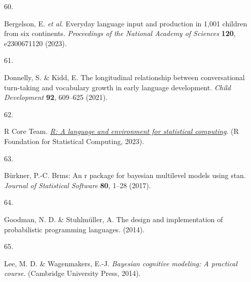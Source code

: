 \documentclass[
  man,floatsintext]{apa6}
\newlength{\cslhangindent}
\newlength{\csllabelwidth}
\newlength{\cslentryspacingunit} %
\newenvironment{CSLReferences}[2] %
 {%
  \setlength{\parindent}{0pt}
  \ifodd #1
  \let\oldpar\par
  \def\par{\hangindent=\cslhangindent\oldpar}
  \fi
  \setlength{\parskip}{#2\cslentryspacingunit}
 }%
 {}
\newcommand{\CSLLeftMargin}[1]{\parbox[t]{\csllabelwidth}{#1}}
\newcommand{\CSLRightInline}[1]{\parbox[t]{\linewidth - \csllabelwidth}{#1}\break}
\begin{document}
\begin{CSLReferences}{0}{0}
\leavevmode{}%
\CSLLeftMargin{60. }%
\CSLRightInline{Bergelson, E. \emph{et al.} Everyday language input and production in 1,001 children from six continents. \emph{Proceedings of the National Academy of Sciences} \textbf{120}, e2300671120 (2023).}

\leavevmode{}%
\CSLLeftMargin{61. }%
\CSLRightInline{Donnelly, S. \& Kidd, E. The longitudinal relationship between conversational turn-taking and vocabulary growth in early language development. \emph{Child Development} \textbf{92}, 609--625 (2021).}

\leavevmode{}%
\CSLLeftMargin{62. }%
\CSLRightInline{R Core Team. \emph{\href{https://www.R-project.org/}{R: A language and environment for statistical computing}}. (R Foundation for Statistical Computing, 2023).}

\leavevmode{}%
\CSLLeftMargin{63. }%
\CSLRightInline{Bürkner, P.-C. Brms: An r package for bayesian multilevel models using stan. \emph{Journal of Statistical Software} \textbf{80}, 1--28 (2017).}

\leavevmode{}%
\CSLLeftMargin{64. }%
\CSLRightInline{Goodman, N. D. \& Stuhlmüller, A. {The design and implementation of probabilistic programming languages}. (2014).}

\leavevmode{}%
\CSLLeftMargin{65. }%
\CSLRightInline{Lee, M. D. \& Wagenmakers, E.-J. \emph{Bayesian cognitive modeling: A practical course}. (Cambridge University Press, 2014).}

\end{CSLReferences}
\end{document}
